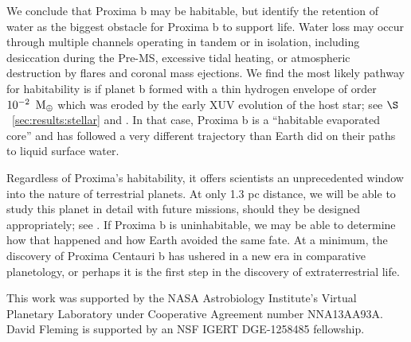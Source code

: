 \documentclass[preprint,12pt]{aastex}
\newcommand{\xxx}[1]{{\color{red} #1}} %
\def\mearth{{\rm\,M_\oplus}}
\begin{document}
We conclude that Proxima b may be habitable, but identify the
retention of water as the biggest obstacle for Proxima b to support
life. Water loss may occur through multiple channels operating in
tandem or in isolation, including desiccation during the Pre-MS,
excessive tidal heating, or atmospheric destruction by flares and
coronal mass ejections. We find the most likely pathway for
habitability is if planet b formed with a thin hydrogen envelope of
order $10^{-2}~\mearth$ which was eroded by the early XUV evolution of
the host star; see $\S$~\ref{sec:results:stellar} and \cite{Luger15}. In
that case, Proxima b is a ``habitable evaporated core'' and has
followed a very different trajectory than Earth did on their paths to
liquid surface water.

Regardless of Proxima's habitability, it offers scientists an
\xxx{unprecedented} window into the nature of terrestrial planets. At only
1.3 pc distance, we will be able to study this planet in detail with
future missions, should they be designed appropriately; see
\cite{Meadows16}. If Proxima b is uninhabitable, we may be able to
determine how that happened and how Earth avoided the same fate. At a
minimum, the discovery of Proxima Centauri b has ushered in a new era
in comparative planetology, or perhaps it is the first step in the
discovery of extraterrestrial life.
 
\vspace{1cm}
This work was supported by the NASA Astrobiology Institute's Virtual
Planetary Laboratory under Cooperative Agreement number NNA13AA93A.
David Fleming is supported by an NSF IGERT DGE-1258485 fellowship.



\end{document}
